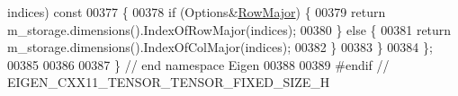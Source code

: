 \begin{DoxyCode}
      indices)\textcolor{keyword}{ const}
00377 \textcolor{keyword}{    }\{
00378       \textcolor{keywordflow}{if} (Options&\hyperlink{group__enums_ggaacded1a18ae58b0f554751f6cdf9eb13acfcde9cd8677c5f7caf6bd603666aae3}{RowMajor}) \{
00379         \textcolor{keywordflow}{return} m\_storage.dimensions().IndexOfRowMajor(indices);
00380       \} \textcolor{keywordflow}{else} \{
00381         \textcolor{keywordflow}{return} m\_storage.dimensions().IndexOfColMajor(indices);
00382       \}
00383     \}
00384 \};
00385 
00386 
00387 \} \textcolor{comment}{// end namespace Eigen}
00388 
00389 \textcolor{preprocessor}{#endif // EIGEN\_CXX11\_TENSOR\_TENSOR\_FIXED\_SIZE\_H}
\end{DoxyCode}
